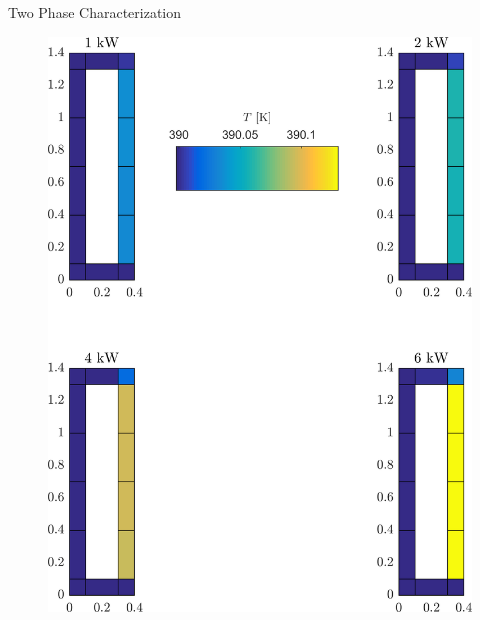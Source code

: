 \documentclass[10pt,t,xcolor=table,compress]{UWMadBeamer}
\begin{document}
\begin{frame}{Two Phase Characterization}
{\begin{figure}
                \includegraphics[scale=0.074]{Distribution_Temperature-390K-2Phi}%
            \end{figure}
        }
\end{frame}
\end{document}
